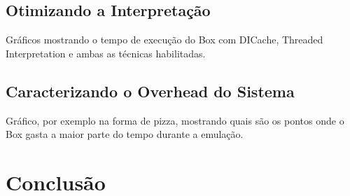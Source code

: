 \documentclass[11pt,twoside]{article}
\begin{document}
\subsection{Otimizando a Interpretação}

Gráficos mostrando o tempo de execução do Box com DICache, Threaded Interpretation
e ambas as técnicas habilitadas.

\subsection{Caracterizando o Overhead do Sistema}

Gráfico, por exemplo na forma de pizza, mostrando quais são os pontos onde o Box
gasta a maior parte do tempo durante a emulação.







\section{Conclusão}  \label{sec:conclusao}




\newpage

\end{document}
